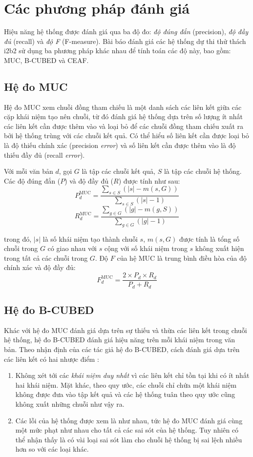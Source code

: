 \section{Các phương pháp đánh giá}
Hiệu năng hệ thống được đánh giá qua ba độ đo: \emph{độ đúng đắn} (precision), \emph{độ đầy đủ} (recall) và \emph{độ F} (F-measure). Bài báo đánh giá các hệ thống dự thi thử thách i2b2 sử dụng ba phương pháp khác nhau để tính toán các độ này, bao gồm: MUC, B-CUBED và CEAF.

\subsection*{Hệ đo MUC}
Hệ đo MUC \cite{MarcVilain1995} xem chuỗi đồng tham chiếu là một danh sách các liên kết giữa các cặp khái niệm tạo nên chuỗi, từ đó đánh giá hệ thống dựa trên số lượng ít nhất các liên kết cần được thêm vào và loại bỏ để các chuỗi đồng tham chiếu xuất ra bởi hệ thống trùng với các chuỗi kết quả. Có thể hiểu số liên kết cần được loại bỏ là độ thiếu chính xác (precision \emph{error}) và số liên kết cần được thêm vào là độ thiếu đầy đủ (recall \emph{error}). 

Với mỗi văn bản $d$, gọi $G$ là tập các chuỗi kết quả, $S$ là tập các chuỗi hệ thống. Các độ đúng đắn ($P$) và độ đầy đủ ($R$) được tính như sau:
\[P_d^{\text{MUC}}=\frac{\sum_{s\in S} \left(|s| - m(s, G)\right)}{\sum_{s\in S}\left(|s| - 1\right)}\]
\[R_d^{\text{MUC}}=\frac{\sum_{g\in G}(|g|-m(g,S))}{\sum_{g\in G}(|g|-1)}\]

\noindent trong đó, $|s|$ là số khái niệm tạo thành chuỗi $s$, $m(s,G)$ được tính là tổng số chuỗi trong $G$ có giao nhau với $s$ cộng với số khái niệm trong $s$ không xuất hiện trong tất cả các chuỗi trong $G$. Độ $F$ của hệ MUC là trung bình điều hòa của độ chính xác và độ đầy đủ:
\[F_d^{\text{MUC}}=\frac{2\times P_d\times R_d}{P_d + R_d}\]

\subsection*{Hệ đo B-CUBED}
Khác với hệ đo MUC đánh giá dựa trên sự thiếu và thừa các liên kết trong chuỗi hệ thống, hệ đo B-CUBED đánh giá hiệu năng trên mỗi khái niệm trong văn bản. Theo nhận định của các tác giả hệ đo B-CUBED, cách đánh giá dựa trên các liên kết có hai nhược điểm \cite{AmitBagga1998}:

\begin{enumerate}[leftmargin=\parindent]
\item Không xét tới các \emph{khái niệm duy nhất} vì các liên kết chỉ tồn tại khi có ít nhất hai khái niệm. Mặt khác, theo quy ước, các chuỗi chỉ chứa một khái niệm không được đưa vào tập kết quả và các hệ thống tuân theo quy ước cũng không xuất những chuỗi như vậy ra.

\item Các lỗi của hệ thống được xem là như nhau, tức hệ đo MUC đánh giá cùng một mức phạt như nhau cho tất cả các sai sót của hệ thống. Tuy nhiên có thể nhận thấy là có vài loại sai sót làm cho chuỗi hệ thống bị sai lệch nhiều hơn so với các loại khác.
\end{enumerate}

